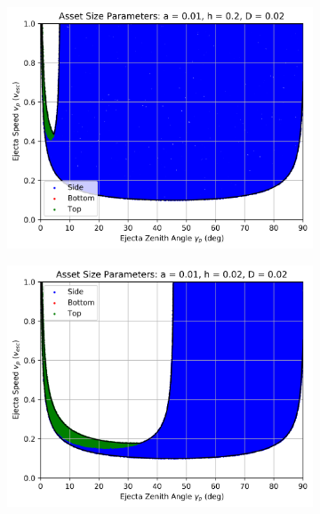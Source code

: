 \documentclass{article}
\begin{document}
\begin{figure}
	\begin{subfigure}[t]{.32\textwidth}
		\centering
		\includegraphics[width=.98\linewidth]{asset_speed_zenith_plot_1.000e-02_2.000e-01_2.000e-02.png}  
		\label{fig:sub-asset_speed_zenith_4}
	\end{subfigure}
	\begin{subfigure}[t]{.32\textwidth}
		\centering
		\includegraphics[width=.98\linewidth]{asset_speed_zenith_plot_1.000e-02_2.000e-02_2.000e-02.png}  
		\label{fig:sub-asset_speed_zenith_5}
	\end{subfigure}

\end{figure}
\end{document}
